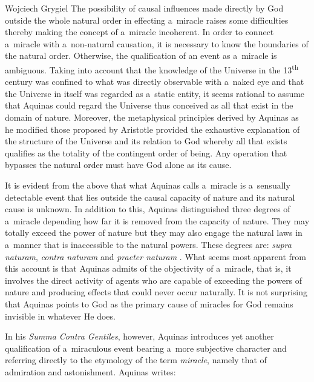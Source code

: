 \begin{artengenv}{Wojciech Grygiel}
{}
The possibility of causal influences made directly by God outside the whole natural order in effecting a~miracle raises some difficulties thereby making the concept of a~miracle incoherent. In order to connect a~miracle with a~non-natural causation, it is necessary to know the boundaries of the natural order. Otherwise, the qualification of an event as a~miracle is ambiguous. Taking into account that the knowledge of the Universe in the 13\textsuperscript{th} century was confined to what was directly observable with a~naked eye and that the Universe in itself was regarded as a~static entity, it seems rational to assume that Aquinas could regard the Universe thus conceived as all that exist in the domain of nature. Moreover, the metaphysical principles derived by Aquinas as he modified those proposed by Aristotle provided the exhaustive explanation of the structure of the Universe and its relation to God whereby all that exists qualifies as the totality of the contingent order of being. Any operation that bypasses the natural order must have God alone as its cause.

It is evident from the above that what Aquinas calls a~miracle is a~sensually detectable event that lies outside the causal capacity of nature and its natural cause is unknown. In addition to this, Aquinas distinguished three degrees of a~miracle depending how far it is removed from the capacity of nature. They may totally exceed the power of nature but they may also engage the natural laws in a~manner that is inaccessible to the natural powers. These degrees are: \textit{supra naturam}, \textit{contra naturam} and \textit{praeter naturam}
\parencite[][]{aquinas_power_1952}. %
 What seems most apparent from this account is that Aquinas admits of the objectivity of a~miracle, that is, it involves the direct activity of agents who are capable of exceeding the powers of nature and producing effects that could never occur naturally. It is not surprising that Aquinas points to God as the primary cause of miracles for God remains invisible in whatever He does.

In his \textit{Summa Contra Gentiles}, however, Aquinas introduces yet another qualification of a~miraculous event bearing a~more subjective character and referring directly to the etymology of the term \textit{miracle}, namely that of admiration and astonishment. Aquinas writes:


\end{artengenv}
